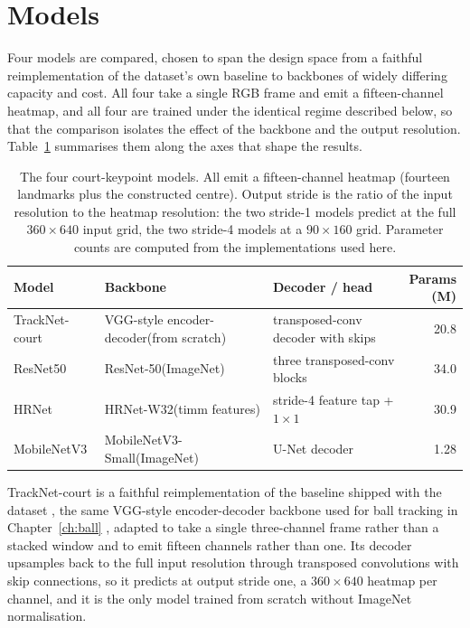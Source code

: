 \section{Models}
\label{sec:court-models}

Four models are compared, chosen to span the design space from a faithful
reimplementation of the dataset's own baseline to backbones of widely differing
capacity and cost. All four take a single RGB frame and emit a fifteen-channel
heatmap, and all four are trained under the identical regime described below, so
that the comparison isolates the effect of the backbone and the output
resolution. Table~\ref{tab:court-models} summarises them along the axes that
shape the results.

\begin{table}[t]
  \centering
  \small
  \setlength{\tabcolsep}{5pt}
  \caption{The four court-keypoint models. All emit a fifteen-channel heatmap
    (fourteen landmarks plus the constructed centre). Output stride is the ratio
    of the input resolution to the heatmap resolution: the two stride-1 models
    predict at the full $360 \times 640$ input grid, the two stride-4 models at a
    $90 \times 160$ grid. Parameter counts are computed from the implementations
    used here.}
  \label{tab:court-models}
  \begin{tabular}{@{}l p{3.5cm} p{3.2cm} r@{}}
    \toprule
    Model & Backbone & Decoder / head & \makecell[r]{Params\\(M)} \\
    \midrule
    TrackNet-court & VGG-style encoder-decoder(from scratch) & transposed-conv decoder with skips & 20.8 \\
    ResNet50       & ResNet-50(ImageNet)                      & three transposed-conv blocks       & 34.0 \\
    HRNet          & HRNet-W32(timm features)                 & stride-4 feature tap + $1\times1$  & 30.9 \\
    MobileNetV3    & MobileNetV3-Small(ImageNet)              & U-Net decoder                       & 1.28 \\
    \bottomrule
  \end{tabular}
\end{table}

TrackNet-court is a faithful reimplementation of the baseline shipped with the
dataset \cite{yastrebksv2023courtdetector}, the same VGG-style encoder-decoder
backbone used for ball tracking in Chapter~\ref{ch:ball}
\cite{huang2019tracknet}, adapted to take a single three-channel frame rather
than a stacked window and to emit fifteen channels rather than one. Its decoder
upsamples back to the full input resolution through transposed convolutions with
skip connections, so it predicts at output stride one, a $360 \times 640$ heatmap
per channel, and it is the only model trained from scratch without ImageNet
normalisation.


